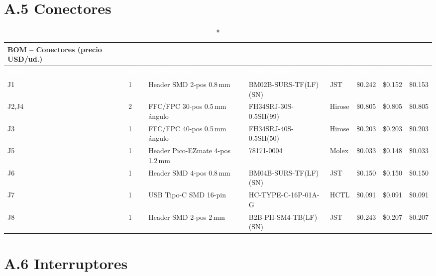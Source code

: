 \section*{A.5 Conectores}

\begin{longtable}{C{1cm} C{0.5cm} L{3.0cm} L{2.8cm} L{1.8cm} R{1.1cm} R{1.1cm} R{1.1cm}}
  \caption*{BOM -- Conectores (precio USD/ud.)}\\
  \toprule
  \textcolor{white}{\textbf{Desig.}} &
  \textcolor{white}{\textbf{Qty}} &
  \textcolor{white}{\textbf{Descripción}} &
  \textcolor{white}{\textbf{Part Number}} &
  \textcolor{white}{\textbf{Fab.}} &
  \textcolor{white}{\textbf{1K}} &
  \textcolor{white}{\textbf{10K}} &
  \textcolor{white}{\textbf{100K}} \\
  \midrule
  \endfirsthead
  \midrule \endhead \bottomrule \endfoot
  J1   & 1 & Header SMD 2-pos 0.8\,mm        & BM02B-SURS-TF(LF)(SN) & JST       & \$0.242 & \$0.152 & \$0.153 \\
  J2,J4 & 2 & FFC/FPC 30-pos 0.5\,mm ángulo  & FH34SRJ-30S-0.5SH(99) & Hirose    & \$0.805 & \$0.805 & \$0.805 \\
  J3   & 1 & FFC/FPC 40-pos 0.5\,mm ángulo   & FH34SRJ-40S-0.5SH(50) & Hirose    & \$0.203 & \$0.203 & \$0.203 \\
  J5   & 1 & Header Pico-EZmate 4-pos 1.2\,mm & 78171-0004            & Molex     & \$0.033 & \$0.148 & \$0.033 \\
  J6   & 1 & Header SMD 4-pos 0.8\,mm         & BM04B-SURS-TF(LF)(SN) & JST       & \$0.150 & \$0.150 & \$0.150 \\
  J7   & 1 & USB Tipo-C SMD 16-pin            & HC-TYPE-C-16P-01A-G   & HCTL      & \$0.091 & \$0.091 & \$0.091 \\
  J8   & 1 & Header SMD 2-pos 2\,mm           & B2B-PH-SM4-TB(LF)(SN) & JST       & \$0.243 & \$0.207 & \$0.207 \\
\end{longtable}

\section*{A.6 Interruptores}

